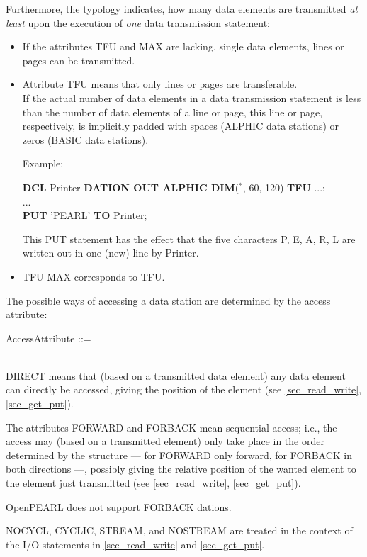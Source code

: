 Furthermore, the typology indicates, how many data elements are
transmitted {\em at least} upon the execution of {\em one} data
transmission statement:
\begin{itemize}
\item If the attributes TFU and MAX are lacking, single data elements,
lines or pages can be transmitted.
\item Attribute TFU means that only lines or pages are transferable.\\
If the actual number of data elements in a data transmission statement
is less than the number of data elements of a line or page, this line or
page, respectively, is implicitly padded with spaces (ALPHIC data
stations) or zeros (BASIC data stations).

Example:

{\bf DCL} Printer {\bf DATION OUT ALPHIC DIM}($^*$, 60, 120) {\bf TFU} ...;\\
... \\
{\bf PUT} 'PEARL' {\bf TO} Printer;

This PUT statement has the effect that the five characters P, E, A, R,
L are written out in one (new) line by Printer.
\item TFU MAX corresponds to TFU.
\end{itemize}

The possible ways of accessing a data station are determined by the
access attribute:

AccessAttribute ::= \\
\\

DIRECT means that (based on a transmitted data element) any data element
can directly be accessed, giving the position of the element
(see \ref{sec_read_write}, \ref{sec_get_put}).

The attributes FORWARD and FORBACK mean sequential access; i.e., the
access may (based on a transmitted element) only take place in the order
determined by the structure --- for FORWARD only forward, for FORBACK in
both directions ---, possibly giving the relative position of the wanted
element to the element just transmitted 
(see \ref{sec_read_write}, \ref{sec_get_put}).

\begin{added}
OpenPEARL does not support FORBACK dations.
\end{added}

NOCYCL, CYCLIC, STREAM, and NOSTREAM are treated in the context of the
I/O statements in 
\ref{sec_read_write} and \ref{sec_get_put}.

